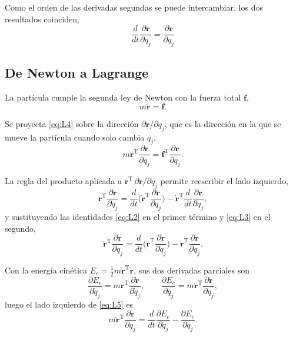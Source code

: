 \documentclass[11pt]{article}
\newcommand{\T}{^{\mathrm{T}}}
\newcommand{\pd}[2]{\frac{\partial #1}{\partial #2}}
\begin{document}
Como el orden de las derivadas segundas se puede intercambiar, los dos resultados coinciden,
\begin{equation}
\boxed{\ \frac{d}{dt}\pd{\mathbf{r}}{q_j}=\pd{\dot{\mathbf{r}}}{q_j}\ }
\label{eq:L3}
\end{equation}

\subsection{De Newton a Lagrange}

La partícula cumple la segunda ley de Newton con la fuerza total $\mathbf{f}$,
\begin{equation}
m\ddot{\mathbf{r}}=\mathbf{f}.
\label{eq:L4}
\end{equation}

Se proyecta \eqref{eq:L4} sobre la dirección $\partial\mathbf{r}/\partial q_j$, que es la dirección en la que se mueve la partícula cuando solo cambia $q_j$,
\begin{equation}
m\ddot{\mathbf{r}}\T\pd{\mathbf{r}}{q_j}=\mathbf{f}\T\pd{\mathbf{r}}{q_j}.
\label{eq:L5}
\end{equation}

La regla del producto aplicada a $\dot{\mathbf{r}}\T\,\partial\mathbf{r}/\partial q_j$ permite reescribir el lado izquierdo,
\begin{equation}
\ddot{\mathbf{r}}\T\pd{\mathbf{r}}{q_j}
=\frac{d}{dt}\Big(\dot{\mathbf{r}}\T\pd{\mathbf{r}}{q_j}\Big)-\dot{\mathbf{r}}\T\frac{d}{dt}\pd{\mathbf{r}}{q_j},
\label{eq:L6}
\end{equation}
y sustituyendo las identidades \eqref{eq:L2} en el primer término y \eqref{eq:L3} en el segundo,
\begin{equation}
\ddot{\mathbf{r}}\T\pd{\mathbf{r}}{q_j}
=\frac{d}{dt}\Big(\dot{\mathbf{r}}\T\pd{\dot{\mathbf{r}}}{\dot q_j}\Big)-\dot{\mathbf{r}}\T\pd{\dot{\mathbf{r}}}{q_j}.
\label{eq:L7}
\end{equation}

Con la energía cinética $E_c=\tfrac12m\dot{\mathbf{r}}\T\dot{\mathbf{r}}$, sus dos derivadas parciales son
\begin{equation}
\pd{E_c}{\dot q_j}=m\dot{\mathbf{r}}\T\pd{\dot{\mathbf{r}}}{\dot q_j},
\qquad
\pd{E_c}{q_j}=m\dot{\mathbf{r}}\T\pd{\dot{\mathbf{r}}}{q_j},
\label{eq:L8}
\end{equation}
luego el lado izquierdo de \eqref{eq:L5} es
\begin{equation}
m\ddot{\mathbf{r}}\T\pd{\mathbf{r}}{q_j}=\frac{d}{dt}\pd{E_c}{\dot q_j}-\pd{E_c}{q_j}.
\label{eq:L9}
\end{equation}
\end{document}
